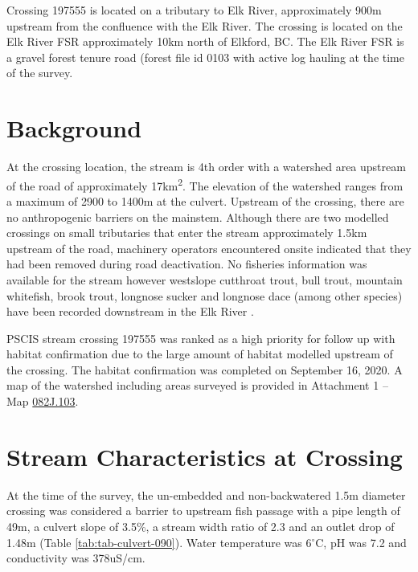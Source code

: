 \documentclass[
]{book}
\begin{document}
Crossing 197555 is located on a tributary to Elk River, approximately 900m upstream from the confluence with the Elk River. The crossing is located on the Elk River FSR approximately 10km north of Elkford, BC. The Elk River FSR is a gravel forest tenure road (forest file id 0103 with active log hauling at the time of the survey.

\hypertarget{background-7}{%
\section*{Background}\label{background-7}}

At the crossing location, the stream is 4th order with a watershed area upstream of the road of approximately 17km\textsuperscript{2}. The elevation of the watershed ranges from a maximum of 2900 to 1400m at the culvert. Upstream of the crossing, there are no anthropogenic barriers on the mainstem. Although there are two modelled crossings on small tributaries that enter the stream approximately 1.5km upstream of the road, machinery operators encountered onsite indicated that they had been removed during road deactivation. No fisheries information was available for the stream \citep{moeStreamInventorySample} however westslope cutthroat trout, bull trout, mountain whitefish, brook trout, longnose sucker and longnose dace (among other species) have been recorded downstream in the Elk River \citep{data_fish_obs}.

PSCIS stream crossing 197555 was ranked as a high priority for follow up with habitat confirmation due to the large amount of habitat modelled upstream of the crossing. The habitat confirmation was completed on September 16, 2020. A map of the watershed including areas surveyed is provided in Attachment 1 -- Map \url{082J.103}.

\hypertarget{stream-characteristics-at-crossing-6}{%
\section*{Stream Characteristics at Crossing}\label{stream-characteristics-at-crossing-6}}

At the time of the survey, the un-embedded and non-backwatered 1.5m diameter crossing was considered a barrier to upstream fish passage with a pipe length of 49m, a culvert slope of 3.5\%, a stream width ratio of 2.3 and an outlet drop of 1.48m (Table \ref{tab:tab-culvert-090}). Water temperature was 6\(^\circ\)C, pH was 7.2 and conductivity was 378uS/cm.
\end{document}
